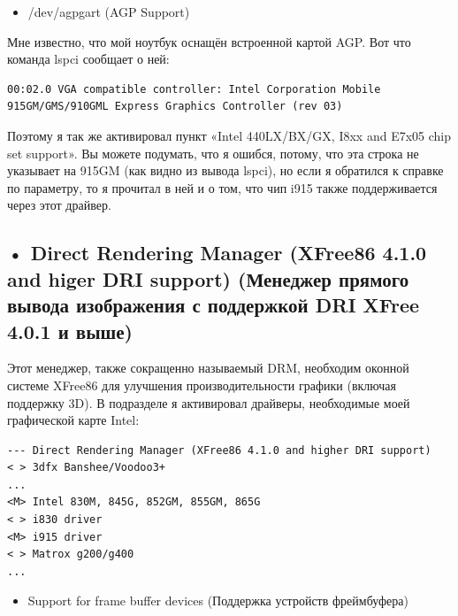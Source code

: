 \documentclass[10pt]{book}
\begin{document}
\begin{itemize}
\item /dev/agpgart (AGP Support)
\end{itemize}

Мне известно, что мой ноутбук оснащён встроенной картой AGP. Вот что команда lspci сообщает о ней:

\vspace{3mm}
\begin{tcolorbox}
\begin{lstlisting}
00:02.0 VGA compatible controller: Intel Corporation Mobile 915GM/GMS/910GML Express Graphics Controller (rev 03)
\end{lstlisting}
\end{tcolorbox}

Поэтому я так же активировал пункт «Intel 440LX/BX/GX, I8xx and E7x05 chip set support». Вы можете подумать, что я ошибся, потому, что эта строка не указывает на 915GM (как видно из вывода lspci), но если я обратился к справке по параметру, то я прочитал в ней и о том, что чип i915 также поддерживается через этот драйвер. 

\subsection{• Direct Rendering Manager (XFree86 4.1.0 and higer DRI support) (Менеджер прямого вывода изображения с поддержкой DRI XFree 4.0.1 и выше)}

Этот менеджер, также сокращенно называемый DRM, необходим оконной системе XFree86 для улучшения производительности графики (включая поддержку 3D). В подразделе я активировал драйверы, необходимые моей графической карте Intel: 

\vspace{3mm}
\begin{tcolorbox}[colback=gray!14!white, colframe=blue!75!blue]
\begin{lstlisting}
--- Direct Rendering Manager (XFree86 4.1.0 and higher DRI support)
< > 3dfx Banshee/Voodoo3+
...
<M> Intel 830M, 845G, 852GM, 855GM, 865G
< > i830 driver
<M> i915 driver
< > Matrox g200/g400
...
\end{lstlisting}
\end{tcolorbox}

\begin{itemize}
\item Support for frame buffer devices (Поддержка устройств фреймбуфера)
\end{itemize}
\end{document}
